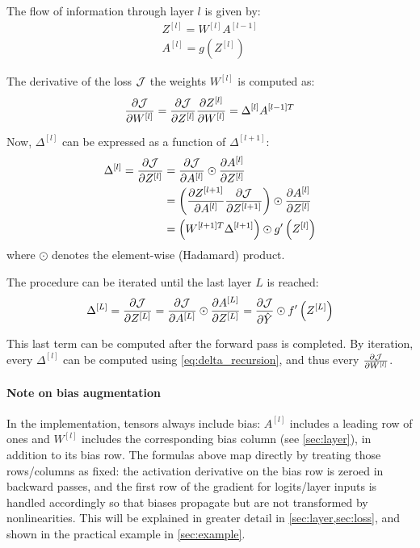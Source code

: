 The flow of information through layer $l$ is given by:
\begin{gather}
    Z^{[l]} = W^{[l]} A^{[l-1]} \label{eq:lin_forward}\\
    A^{[l]} = g\left(Z^{[l]}\right) \label{eq:act_forward}
\end{gather}

The derivative of the loss $\mathcal{J}$ \wrt the weights $W^{[l]}$ is computed as:
\begin{equation} \label{eq:weight_grad}
    \pdv{\mathcal{J}}{W^{[l]}} = \pdv{\mathcal{J}}{Z^{[l]}} \pdv{Z^{[l]}}{W^{[l]}} = \Delta^{[l]} A^{[l-1]T}
\end{equation}

Now, $\Delta^{[l]}$ can be expressed as a function of $\Delta^{[l + 1]}$:
\begin{equation} \label{eq:delta_recursion}
\begin{split}
    \Delta^{[l]} = \pdv{\mathcal{J}}{Z^{[l]}} &= \pdv{\mathcal{J}}{A^{[l]}} \odot \pdv{A^{[l]}}{Z^{[l]}}\\
    &= \left(\pdv{Z^{[l+1]}}{A^{[l]}} \pdv{\mathcal{J}}{Z^{[l+1]}} \right) \odot \pdv{A^{[l]}}{Z^{[l]}}\\
    &= \left(W^{[l+1]T} \Delta^{[l+1]} \right) \odot g'\left(Z^{[l]}\right)
\end{split}
\end{equation}
where $\odot$ denotes the element-wise (Hadamard) product.

The procedure can be iterated until the last layer $L$ is reached:
\begin{equation*}
    \Delta^{[L]} = \pdv{\mathcal{J}}{Z^{[L]}} = \pdv{\mathcal{J}}{A^{[L]}} \odot \pdv{A^{[L]}}{Z^{[L]}} = \pdv{\mathcal{J}}{\hat{Y}} \odot f'\left(Z^{[L]}\right)
\end{equation*}

This last term can be computed after the forward pass is completed. By iteration, every $\Delta^{[l]}$ can be computed using \cref{eq:delta_recursion}, and thus every $\pdv{\mathcal{J}}{W^{[l]}}$.

\paragraph{Note on bias augmentation} In the implementation, tensors always include bias: $A^{[l]}$ includes a leading row of ones and $W^{[l]}$ includes the corresponding bias column (see \cref{sec:layer}), in addition to its bias row. The formulas above map directly by treating those rows/columns as fixed: the activation derivative on the bias row is zeroed in backward passes, and the first row of the gradient for logits/layer inputs is handled accordingly so that biases propagate but are not transformed by nonlinearities. This will be explained in greater detail in \cref{sec:layer,sec:loss}, and shown in the practical example in \cref{sec:example}.
